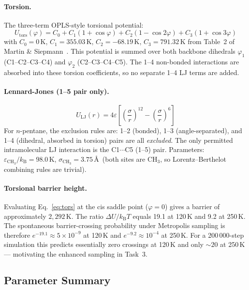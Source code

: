 \documentclass[12pt,a4paper]{article}
\begin{document}
\paragraph{Torsion.}
The three-term OPLS-style torsional potential:
\begin{equation}
  U_{\mathrm{tors}}(\varphi) = C_0 + C_1(1+\cos\varphi)
    + C_2(1-\cos 2\varphi) + C_3(1+\cos 3\varphi)
  \label{eq:tors}
\end{equation}
with $C_0 = 0$\,K, $C_1 = 355.03$\,K, $C_2 = -68.19$\,K,
$C_3 = 791.32$\,K from Table~2 of Martin \& Siepmann~\citeyear{Martin1998}.
This potential is summed over both backbone dihedrals $\varphi_1$
(C1--C2--C3--C4) and $\varphi_2$ (C2--C3--C4--C5).  The 1--4
non-bonded interactions are absorbed into these torsion coefficients,
so no separate 1--4 LJ terms are added.

\paragraph{Lennard-Jones (1--5 pair only).}
\begin{equation}
  U_{\mathrm{LJ}}(r) = 4\varepsilon\left[\left(\frac{\sigma}{r}\right)^{12}
    - \left(\frac{\sigma}{r}\right)^{6}\right]
  \label{eq:lj}
\end{equation}
For $n$-pentane, the exclusion rules are: 1--2 (bonded), 1--3
(angle-separated), and 1--4 (dihedral, absorbed in torsion) pairs are all
\emph{excluded}.  The only permitted intramolecular LJ interaction is the
C1$\cdots$C5 (1--5) pair.  Parameters: $\varepsilon_{\mathrm{CH}_3}/k_{\mathrm{B}} = 98.0$\,K,
$\sigma_{\mathrm{CH}_3} = 3.75$\,\AA\ (both sites are CH$_3$, so Lorentz--Berthelot
combining rules are trivial).

\paragraph{Torsional barrier height.}
Evaluating Eq.~\eqref{eq:tors} at the cis saddle point ($\varphi = 0$)
gives a barrier of approximately $2{,}292$\,K.  The ratio
$\Delta U / k_{\mathrm{B}}T$ equals 19.1 at 120\,K and 9.2 at 250\,K.
The spontaneous barrier-crossing probability under Metropolis sampling is
therefore $e^{-19.1} \approx 5 \times 10^{-9}$ at 120\,K and
$e^{-9.2} \approx 10^{-4}$ at 250\,K.  For a 200\,000-step simulation
this predicts essentially zero crossings at 120\,K and only $\sim\!20$
at 250\,K --- motivating the enhanced sampling in Task~3.

\subsection{Parameter Summary}
\end{document}
